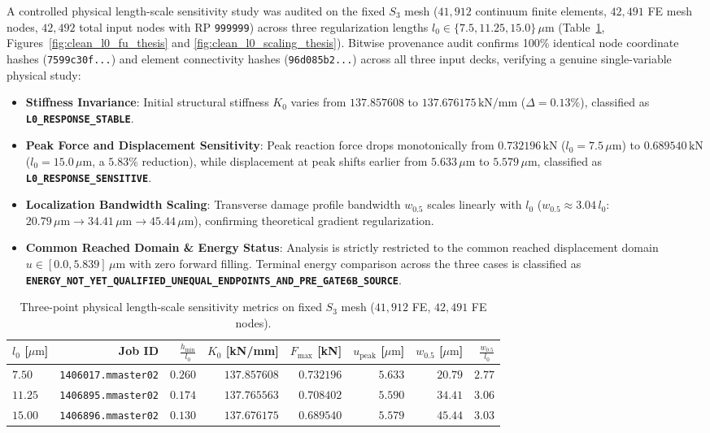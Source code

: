 A controlled physical length-scale sensitivity study was audited on the fixed $S_3$ mesh ($41{,}912$ continuum finite elements, $42{,}491$ FE mesh nodes, $42{,}492$ total input nodes with RP \texttt{999999}) across three regularization lengths $l_0 \in \{7.5, 11.25, 15.0\}\,\mu\text{m}$ (Table~\ref{tab:l0_study_thesis}, Figures~\ref{fig:clean_l0_fu_thesis} and \ref{fig:clean_l0_scaling_thesis}). Bitwise provenance audit confirms 100\% identical node coordinate hashes (\texttt{7599c30f...}) and element connectivity hashes (\texttt{96d085b2...}) across all three input decks, verifying a genuine single-variable physical study:
\begin{itemize}
    \item \textbf{Stiffness Invariance}: Initial structural stiffness $K_0$ varies from $137.857608$ to $137.676175\,\text{kN/mm}$ ($\Delta = 0.13\%$), classified as \textbf{\texttt{L0\_RESPONSE\_STABLE}}.
    \item \textbf{Peak Force and Displacement Sensitivity}: Peak reaction force drops monotonically from $0.732196\,\text{kN}$ ($l_0 = 7.5\,\mu\text{m}$) to $0.689540\,\text{kN}$ ($l_0 = 15.0\,\mu\text{m}$, a $5.83\%$ reduction), while displacement at peak shifts earlier from $5.633\,\mu\text{m}$ to $5.579\,\mu\text{m}$, classified as \textbf{\texttt{L0\_RESPONSE\_SENSITIVE}}.
    \item \textbf{Localization Bandwidth Scaling}: Transverse damage profile bandwidth $w_{0.5}$ scales linearly with $l_0$ ($w_{0.5} \approx 3.04\,l_0$: $20.79\,\mu\text{m} \to 34.41\,\mu\text{m} \to 45.44\,\mu\text{m}$), confirming theoretical gradient regularization.
    \item \textbf{Common Reached Domain \& Energy Status}: Analysis is strictly restricted to the common reached displacement domain $u \in [0.0, 5.839]\,\mu\text{m}$ with zero forward filling. Terminal energy comparison across the three cases is classified as \textbf{\texttt{ENERGY\_NOT\_YET\_QUALIFIED\_UNEQUAL\_ENDPOINTS\_AND\_PRE\_GATE6B\_SOURCE}}.
\end{itemize}

\begin{table}[htbp]
\centering
\caption{Three-point physical length-scale sensitivity metrics on fixed $S_3$ mesh ($41{,}912$ FE, $42{,}491$ FE nodes).}
\label{tab:l0_study_thesis}
\small
\begin{tabular}{lrrrrrrr}
\toprule
$l_0$ [$\mu\text{m}$] & \textbf{Job ID} & $\frac{h_{\min}}{l_0}$ & $K_0$ [kN/mm] & $F_{\max}$ [kN] & $u_{\mathrm{peak}}$ [$\mu\text{m}$] & $w_{0.5}$ [$\mu\text{m}$] & $\frac{w_{0.5}}{l_0}$ \\
\midrule
$7.50$ & \texttt{1406017.mmaster02} & $0.260$ & $137.857608$ & $0.732196$ & $5.633$ & $20.79$ & $2.77$ \\
$11.25$ & \texttt{1406895.mmaster02} & $0.174$ & $137.765563$ & $0.708402$ & $5.590$ & $34.41$ & $3.06$ \\
$15.00$ & \texttt{1406896.mmaster02} & $0.130$ & $137.676175$ & $0.689540$ & $5.579$ & $45.44$ & $3.03$ \\
\bottomrule
\end{tabular}
\end{table}

